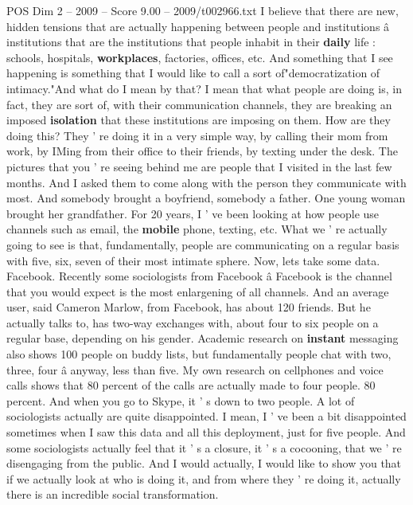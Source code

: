 \begin{textsample}{POS Dim 2 – 2009 – Score 9.00 – 2009/t002966.txt}  \label{ex:f2_pos_092}
I believe that there are new, hidden tensions that are actually happening between people and institutions â institutions that are the institutions that people inhabit in their \textbf{daily} life : schools, hospitals, \textbf{workplaces}, factories, offices, etc.
And something that I see happening is something that I would like to call a sort of"democratization of intimacy."And what do I mean by that?
I mean that what people are doing is, in fact, they are sort of, with their communication channels, they are breaking an imposed \textbf{isolation} that these institutions are imposing on them.
How are they doing this?
They ' re doing it in a very simple way, by calling their mom from work, by IMing from their office to their friends, by texting under the desk.
The pictures that you ' re seeing behind me are people that I visited in the last few months.
And I asked them to come along with the person they communicate with most.
And somebody brought a boyfriend, somebody a father.
One young woman brought her grandfather.
For 20 years, I ' ve been looking at how people use channels such as email, the \textbf{mobile} phone, texting, etc.
What we ' re actually going to see is that, fundamentally, people are communicating on a regular basis with five, six, seven of their most intimate sphere.
Now, lets take some data.
Facebook.
Recently some sociologists from Facebook â Facebook is the channel that you would expect is the most enlargening of all channels.
And an average user, said Cameron Marlow, from Facebook, has about 120 friends.
But he actually talks to, has two-way exchanges with, about four to six people on a regular base, depending on his gender.
Academic research on \textbf{instant} messaging also shows 100 people on buddy lists, but fundamentally people chat with two, three, four â anyway, less than five.
My own research on cellphones and voice calls shows that 80 percent of the calls are actually made to four people. 80 percent.
And when you go to Skype, it ' s down to two people.
A lot of sociologists actually are quite disappointed.
I mean, I ' ve been a bit disappointed sometimes when I saw this data and all this deployment, just for five people.
And some sociologists actually feel that it ' s a closure, it ' s a cocooning, that we ' re disengaging from the public.
And I would actually, I would like to show you that if we actually look at who is doing it, and from where they ' re doing it, actually there is an incredible social transformation.

\end{textsample}
